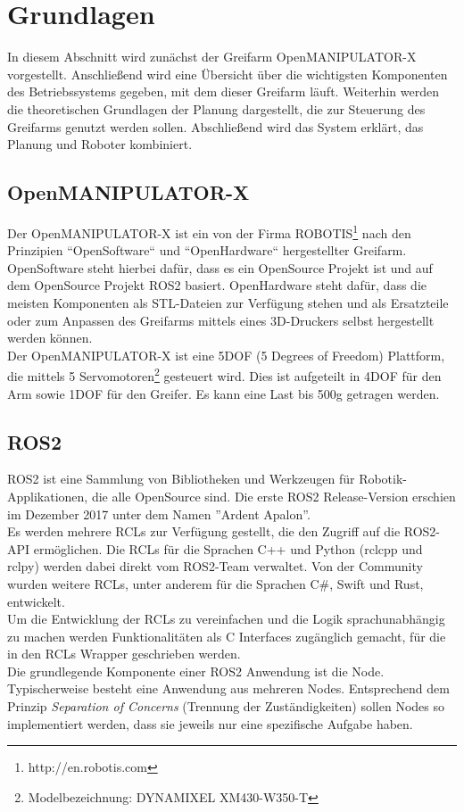 \section {Grundlagen}
In diesem Abschnitt wird zunächst der Greifarm OpenMANIPULATOR-X vorgestellt.
Anschließend wird eine Übersicht über die wichtigsten Komponenten des Betriebssystems gegeben, mit dem dieser Greifarm läuft.
Weiterhin werden die theoretischen Grundlagen der Planung dargestellt, die zur Steuerung des Greifarms genutzt werden sollen.
Abschließend wird das System erklärt, das Planung und Roboter kombiniert.
\subsection{OpenMANIPULATOR-X}
Der OpenMANIPULATOR-X ist ein von der Firma ROBOTIS{\footnote{http://en.robotis.com}} nach den Prinzipien ``OpenSoftware`` und ``OpenHardware`` hergestellter Greifarm.
OpenSoftware steht hierbei dafür, dass es ein OpenSource Projekt ist und auf dem OpenSource Projekt \ac{ROS2} basiert.
OpenHardware steht dafür, dass die meisten Komponenten als STL-Dateien zur Verfügung stehen und als Ersatzteile oder zum Anpassen des Greifarms mittels eines 3D-Druckers selbst hergestellt werden können.\\
Der OpenMANIPULATOR-X ist eine 5DOF (5 Degrees of Freedom) Plattform, die mittels 5 Servomotoren{\footnote{Modelbezeichnung: DYNAMIXEL XM430-W350-T}} gesteuert wird.
Dies ist aufgeteilt in 4DOF für den Arm sowie 1DOF für den Greifer.
Es kann eine Last bis 500g getragen werden.
\subsection{ROS2}
\acf{ROS2} ist eine Sammlung von Bibliotheken und Werkzeugen für Robotik-Applikationen, die alle OpenSource sind.
Die erste \ac{ROS2} Release-Version erschien im Dezember 2017 unter dem Namen ''Ardent Apalon''.\\
Es werden  mehrere \acp{RCL}  zur Verfügung gestellt, die den Zugriff auf die \ac{ROS2}-API ermöglichen.
Die \acp{RCL} für die Sprachen C++ und Python (rclcpp und rclpy) werden dabei direkt vom \ac{ROS2}-Team verwaltet.
Von der Community wurden weitere \acp{RCL}, unter anderem für die Sprachen C\#, Swift und Rust, entwickelt.\\
Um die Entwicklung der \acp{RCL} zu vereinfachen und die Logik sprachunabhängig zu machen werden Funktionalitäten als C Interfaces zugänglich gemacht, für die in den \acp{RCL} Wrapper geschrieben werden.\\
Die grundlegende Komponente einer \ac{ROS2} Anwendung ist die Node.
Typischerweise besteht eine Anwendung aus mehreren Nodes.
Entsprechend dem Prinzip \emph{Separation of Concerns} (Trennung der Zuständigkeiten) sollen Nodes so implementiert werden, dass sie jeweils nur eine spezifische Aufgabe haben.
